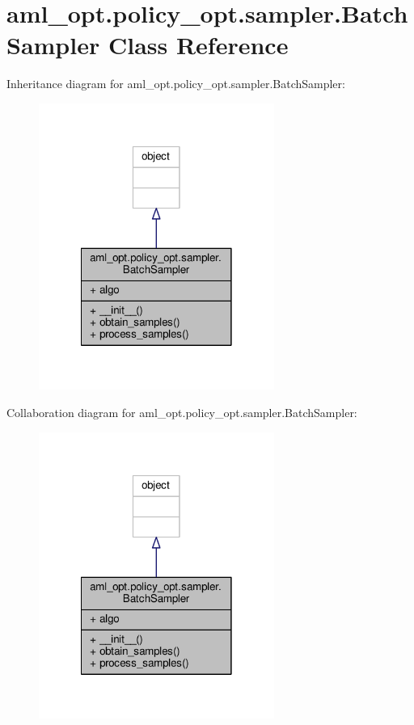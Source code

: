 \hypertarget{classaml__opt_1_1policy__opt_1_1sampler_1_1_batch_sampler}{\section{aml\-\_\-opt.\-policy\-\_\-opt.\-sampler.\-Batch\-Sampler Class Reference}
\label{classaml__opt_1_1policy__opt_1_1sampler_1_1_batch_sampler}
}


Inheritance diagram for aml\-\_\-opt.\-policy\-\_\-opt.\-sampler.\-Batch\-Sampler\-:
\nopagebreak
\begin{figure}[H]
\begin{center}
\leavevmode
\includegraphics[width=218pt]{classaml__opt_1_1policy__opt_1_1sampler_1_1_batch_sampler__inherit__graph}
\end{center}
\end{figure}


Collaboration diagram for aml\-\_\-opt.\-policy\-\_\-opt.\-sampler.\-Batch\-Sampler\-:
\nopagebreak
\begin{figure}[H]
\begin{center}
\leavevmode
\includegraphics[width=218pt]{classaml__opt_1_1policy__opt_1_1sampler_1_1_batch_sampler__coll__graph}
\end{center}
\end{figure}
